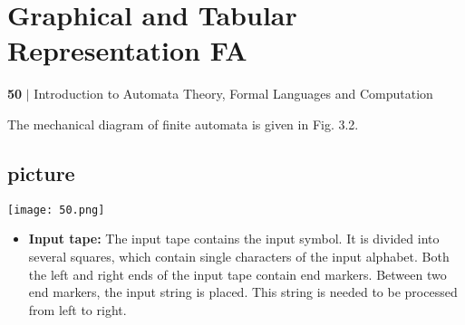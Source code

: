 \documentclass[8pt]{beamer}
\begin{document}
\begin{frame}
\section*{Graphical and Tabular Representation FA}
 \begin{flushleft}
    \textbf{50}\hspace*{0.1cm} \textbf{$|$} \hspace*{0.1cm} Introduction to Automata Theory, Formal Languages and Computation
  \end{flushleft}
\vspace*{0.4cm}

The mechanical diagram of finite automata is given in Fig. 3.2.\\

\begin{center}
\section{picture}
\texttt{[image: 50.png]}
\end{center}

\begin{itemize}
  \item \textbf{Input tape:} The input tape contains the input symbol. It is divided into several squares, which contain
single characters of the input alphabet. Both the left and right ends of the input tape contain end
markers. Between two end markers, the input string is placed. This string is needed to be processed
from left to right.\\
\end{itemize}
\end{frame}
\end{document}
